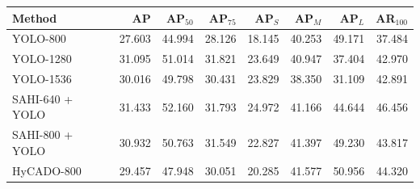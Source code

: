 \begin{tabular}{lrrrrrrr}
\toprule
Method & AP & AP$_{50}$ & AP$_{75}$ & AP$_S$ & AP$_M$ & AP$_L$ & AR$_{100}$\\
\midrule
YOLO-800 & 27.603 & 44.994 & 28.126 & 18.145 & 40.253 & 49.171 & 37.484\\
YOLO-1280 & 31.095 & 51.014 & 31.821 & 23.649 & 40.947 & 37.404 & 42.970\\
YOLO-1536 & 30.016 & 49.798 & 30.431 & 23.829 & 38.350 & 31.109 & 42.891\\
SAHI-640 + YOLO & 31.433 & 52.160 & 31.793 & 24.972 & 41.166 & 44.644 & 46.456\\
SAHI-800 + YOLO & 30.932 & 50.763 & 31.549 & 22.827 & 41.397 & 49.230 & 43.817\\
HyCADO-800 & 29.457 & 47.948 & 30.051 & 20.285 & 41.577 & 50.956 & 44.320\\
\bottomrule
\end{tabular}
